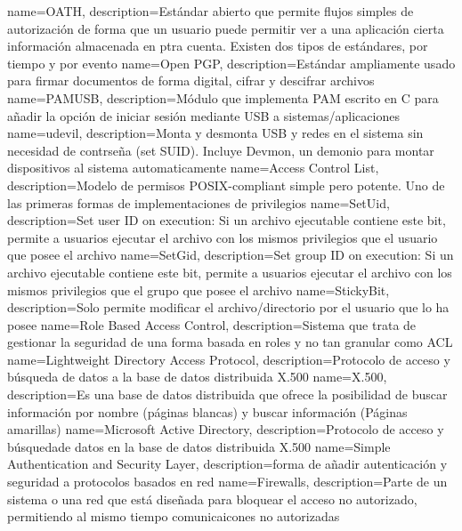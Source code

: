{
	name=OATH,
	description={Estándar abierto que permite flujos simples de autorización de forma que un usuario puede permitir ver a una aplicación cierta información almacenada en ptra cuenta. Existen dos tipos de estándares, por tiempo y por evento}
}
{
	name=Open PGP,
	description={Estándar ampliamente usado para firmar documentos de forma digital, cifrar y descifrar archivos}
}
{
	name=PAMUSB,
	description={Módulo que implementa PAM escrito en C para añadir la opción de iniciar sesión mediante USB a sistemas/aplicaciones}
}
{
	name=udevil,
	description={Monta y desmonta USB y redes en el sistema sin necesidad de contrseña (set SUID). Incluye Devmon, un demonio para montar dispositivos al sistema automaticamente}
}
{
	name=Access Control List,
	description={Modelo de permisos POSIX-compliant simple pero potente. Uno de las primeras formas de implementaciones de privilegios}
}
{
	name=SetUid,
	description={Set user ID on execution: Si un archivo ejecutable contiene este bit, permite a usuarios ejecutar el archivo con los mismos privilegios que el usuario que posee el archivo}
}
{
	name=SetGid,
	description={Set group ID on execution: Si un archivo ejecutable contiene este bit, permite a usuarios ejecutar el archivo con los mismos privilegios que el grupo que posee el archivo}
}
{
	name=StickyBit,
	description={Solo permite modificar el archivo/directorio por el usuario que lo ha posee}
}
{
	name=Role Based Access Control,
	description={Sistema que trata de gestionar la seguridad de una forma basada en roles y no tan granular como ACL}
}
{
	name=Lightweight Directory Access Protocol,
	description={Protocolo de acceso y búsqueda de datos a la base de datos distribuida X.500}
}
{
	name=X.500,
	description={Es una base de datos distribuida que ofrece la posibilidad de buscar información por nombre (páginas blancas) y buscar información (Páginas amarillas)}
}
{
	name=Microsoft Active Directory,
	description={Protocolo de acceso y búsquedade datos en la base de datos distribuida X.500}
}
{
	name=Simple Authentication and Security Layer,
	description={forma de añadir autenticación y seguridad a protocolos basados en red}
}
{
	name=Firewalls,
	description={Parte de un sistema o una red que está diseñada para bloquear el acceso no autorizado, permitiendo al mismo tiempo comunicaicones no autorizadas}
}
